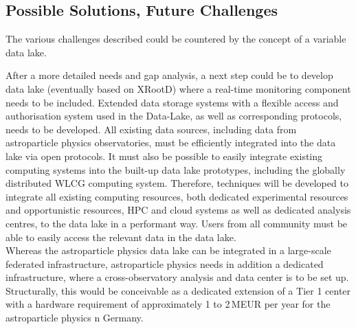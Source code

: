 \subsection{Possible Solutions, Future Challenges}

The various challenges described could be countered by the concept of a variable data lake. 

After a more detailed needs and gap analysis, a next step could be to 
develop data lake (eventually based on XRootD) where a real-time monitoring component needs to be included. 
Extended data storage systems with a flexible access and authorisation system used in the Data-Lake, as well as corresponding protocols, needs to be developed. 
All existing data sources, including data from astroparticle physics observatories, must be efficiently integrated into the data lake via open protocols. It must also be possible to easily integrate existing computing systems into the built-up data lake prototypes, including the globally distributed WLCG computing system. 
Therefore, techniques will be developed to integrate all existing computing resources, both dedicated experimental resources and opportunistic resources, HPC and cloud systems as well as dedicated analysis centres, to the data lake in a performant way. 
Users from all community must be able to easily access the relevant data in the data lake. \\

Whereas the astroparticle physics data lake can be integrated in a large-scale federated infrastructure, astroparticle physics needs in addition a dedicated infrastructure, where a cross-observatory analysis and data center is to be set up. 
Structurally, this would be conceivable as a dedicated extension of a Tier 1
center with a hardware requirement of approximately 1 to 2\,MEUR per year for the astroparticle physics n Germany.




